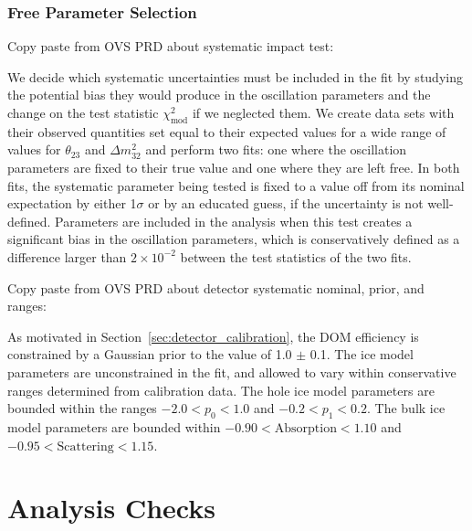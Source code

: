 \subsubsection{Free Parameter Selection} 





Copy paste from OVS PRD about systematic impact test:

We decide which systematic uncertainties must be included in the fit by studying the potential bias they would produce in the oscillation parameters and the change on the test statistic $\chi^2_\mathrm{mod}$ if we neglected them. We create data sets with their observed quantities set equal to their expected values for a wide range of values for $\theta_{23}$ and $\Delta m^{2}_{32}$ and perform two fits: one where the oscillation parameters are fixed to their true value and one where they are left free. In both fits, the systematic parameter being tested is fixed to a value off from its nominal expectation by either 1$\sigma$ or by an educated guess, if the uncertainty is not well-defined. Parameters are included in the analysis when this test creates a significant bias in the oscillation parameters, which is conservatively defined as a difference larger than $2\times10^{-2}$ between the test statistics of the two fits.

Copy paste from OVS PRD about detector systematic nominal, prior, and ranges:

As motivated in Section~\ref{sec:detector_calibration}, the DOM efficiency is constrained by a Gaussian prior to the value of 1.0 $\pm$ 0.1. The ice model parameters are unconstrained in the fit, and allowed to vary within conservative ranges determined from calibration data. The hole ice model parameters are bounded within the ranges $-2.0<p_{0}<1.0$ and $-0.2<p_{1}<0.2$. The bulk ice model parameters are bounded within $-0.90 < \mathrm{Absorption} < 1.10$ and $-0.95 < \mathrm{Scattering} < 1.15$.


\section{Analysis Checks}

